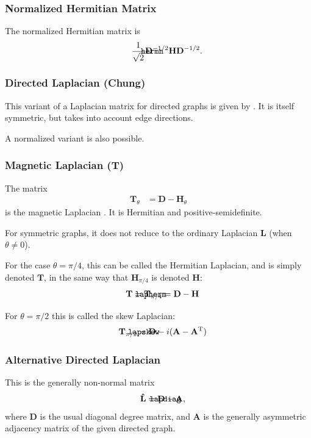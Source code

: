 \documentclass{article}
\def\mathnote#1{%
  \tag*{\rlap{\hspace\marginparsep\smash{\parbox[t]{\marginparwidth}{#1}}}}
}
\begin{document}
\subsubsection{Normalized Hermitian Matrix}
The normalized Hermitian matrix is
\begin{align*}
  \mathnote{\texttt{hermn}}
  \frac 1{\sqrt 2} \mathbf D^{-1/2} \mathbf H \mathbf D^{-1/2}. 
\end{align*}

\subsubsection{Directed Laplacian (Chung)}
This variant of a Laplacian matrix for directed graphs is given by
\cite{b264}.  It is itself symmetric, but takes into account edge
directions. 

A normalized variant is also possible.  

\subsubsection{Magnetic Laplacian ($\mathbf T$)}
The matrix
\begin{align}
  \mathbf T_{\theta} &= \mathbf D - \mathbf H_{\theta} 
\end{align}
is the magnetic Laplacian \citep{b903}.  It is Hermitian and positive-semidefinite.   

For symmetric graphs, it does not reduce to the ordinary Laplacian
$\mathbf L$ (when $\theta \neq 0$). 

For the case $\theta = \pi/4$, this can be called the Hermitian
Laplacian, and is simply denoted $\mathbf T$, in the same way that
$\mathbf H_{\pi/4}$ is denoted $\mathbf H$:
\begin{align*}
  \mathnote{\texttt{lapherm}}
  \mathbf T = \mathbf T_{\pi/4} &= \mathbf D - \mathbf H
\end{align*}

For $\theta = \pi/2$ this is called the skew Laplacian:
\begin{align*}
  \mathnote{\texttt{lapskew}}
  \mathbf T_{\pi/2} &= \mathbf D - i (\mathbf A - \mathbf A^{\mathrm T})
\end{align*}

\subsubsection{Alternative Directed Laplacian}
This is the generally non-normal matrix
\begin{align*}
  \mathnote{\texttt{lapdiag}}
  \mathbf{\hat L} &= \mathbf D - \mathbf A, 
\end{align*}
where $\mathbf D$ is the usual diagonal degree matrix, and $\mathbf A$
is the generally asymmetric adjacency matrix of the given directed
graph. 
\end{document}
